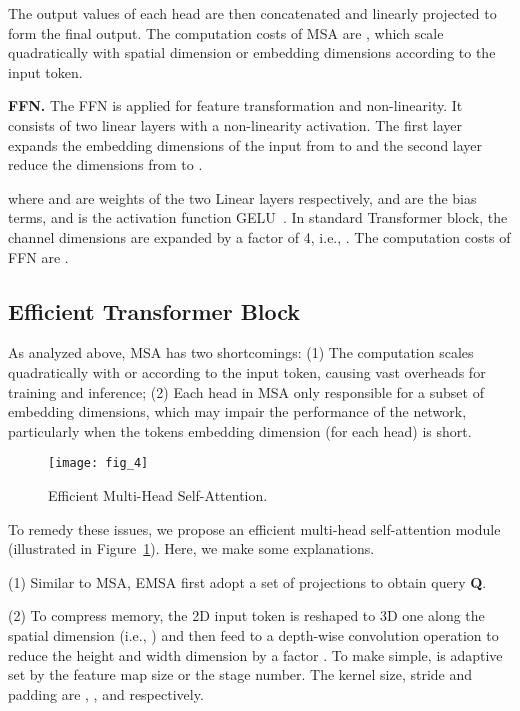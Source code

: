 \documentclass{article}
\begin{document}
The output values of each head are then concatenated and linearly projected to form the final output. The computation costs of MSA are , which scale quadratically with spatial dimension or embedding dimensions according to the input token. 

\textbf{FFN.}
The FFN is applied for feature transformation and non-linearity. It consists of two linear layers with a non-linearity activation. The first layer expands the embedding dimensions of the input from  to  and the second layer reduce the dimensions from  to . 

where  and  are weights of the two Linear layers respectively,  and  are the bias terms, and  is the activation function GELU~\cite{DBLP:journals/corr/HendrycksG16}. In standard Transformer block, the channel dimensions are expanded by a factor of 4, i.e., . The computation costs of FFN are .


\subsection{Efficient Transformer Block}
\label{sec:3.2}



As analyzed above, MSA has two shortcomings: (1) The computation scales quadratically with  or  according to the input token, causing vast overheads for training and inference; (2) Each head in MSA only responsible for a subset of embedding dimensions, which may impair the performance of the network, particularly when the tokens embedding dimension (for each head) is short.

\begin{figure}[htb]
	\begin{center}
		\texttt{[image: fig\_4]}
	\end{center}
	\caption{Efficient Multi-Head Self-Attention.}
	\label{fig:figure4}
\end{figure}

To remedy these issues, we propose an efficient multi-head self-attention module (illustrated in Figure~\ref{fig:figure4}). Here, we make some explanations. 

(1) Similar to MSA, EMSA first adopt a set of projections to obtain query \textbf{Q}. 

(2) To compress memory, the 2D input token  is reshaped to 3D one along the spatial dimension (i.e., ) and then feed to a depth-wise convolution operation to reduce the height and width dimension by a factor . To make simple,  is adaptive set by the feature map size or the stage number. The kernel size, stride and padding are , , and  respectively. 
\end{document}
